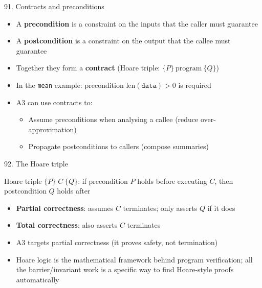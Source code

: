 \documentclass[aspectratio=169]{beamer}
\begin{document}
\begin{frame}{91. Contracts and preconditions}
\begin{itemize}
  \item A \textbf{precondition} is a constraint on the inputs that the caller must guarantee
  \item A \textbf{postcondition} is a constraint on the output that the callee must guarantee
  \item Together they form a \textbf{contract} (Hoare triple: \(\{P\}\ \text{program}\ \{Q\}\))
  \item In the \texttt{mean} example: precondition \(\text{len}(\texttt{data}) > 0\) is required
  \item A3 can use contracts to:
    \begin{itemize}
      \item Assume preconditions when analysing a callee (reduce over-approximation)
      \item Propagate postconditions to callers (compose summaries)
    \end{itemize}
\end{itemize}
\end{frame}

\begin{frame}{92. The Hoare triple}
\begin{block}{Hoare triple}
\(\{P\}\; C\; \{Q\}\): if precondition \(P\) holds before executing \(C\), then postcondition \(Q\) holds after
\end{block}
\begin{itemize}
  \item \textbf{Partial correctness}: assumes \(C\) terminates; only asserts \(Q\) if it does
  \item \textbf{Total correctness}: also asserts \(C\) terminates
  \item A3 targets partial correctness (it proves safety, not termination)
  \item Hoare logic is the mathematical framework behind program verification; all the barrier/invariant work is a specific way to find Hoare-style proofs automatically
\end{itemize}
\end{frame}
\end{document}
